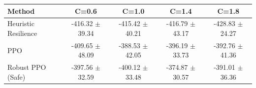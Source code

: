 \small
\setlength{\tabcolsep}{6pt}
\begin{tabular}{lcccc}
\toprule
Method & C=0.6 & C=1.0 & C=1.4 & C=1.8 \\
\midrule
Heuristic Resilience & -416.32 $\pm$ 39.34 & -415.42 $\pm$ 40.21 & -416.79 $\pm$ 43.17 & -428.83 $\pm$ 24.27 \\
PPO & -409.65 $\pm$ 48.09 & -388.53 $\pm$ 42.05 & -396.19 $\pm$ 33.73 & -392.76 $\pm$ 41.36 \\
Robust PPO (Safe) & -397.56 $\pm$ 32.59 & -400.12 $\pm$ 33.48 & -374.87 $\pm$ 30.57 & -391.01 $\pm$ 36.36 \\
\bottomrule
\end{tabular}
